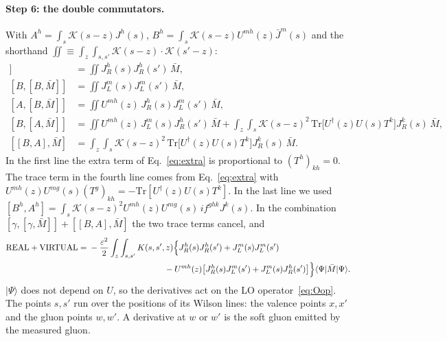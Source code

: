 \documentclass[aps,prd,onecolumn,superscriptaddress,nofootinbib,floatfix,longbibliography,11pt]{revtex4-2}
\numberwithin{equation}{section}
\newcommand{\KK}{\mathcal{K}}
\newcommand{\Ud}{U^{\dagger}}
\newcommand{\Tr}{\mathrm{Tr}}
\begin{document}
\paragraph*{Step 6: the double commutators.} With $A^h=\int_s\KK(s-z)J^h(s)$, $B^h=\int_s\KK(s-z)U^{mh}(z)\bar J^m(s)$ and the shorthand $\iint\equiv\int_z\int_{s,s'}\KK(s-z)\cdot\KK(s'-z)$:
\begin{align}
[A,[A,\bar M]]&=\iint J_R^h(s)J_R^h(s')\,\bar M,\\
[B,[B,\bar M]]&=\iint J_L^m(s)J_L^m(s')\,\bar M,\\
[A,[B,\bar M]]&=\iint U^{mh}(z)\,J_R^h(s)J_L^m(s')\,\bar M,\\
[B,[A,\bar M]]&=\iint U^{mh}(z)\,J_L^m(s)J_R^h(s')\,\bar M+\int_z\int_s\KK(s-z)^2\,\Tr\big[\Ud(z)U(s)T^k\big]J_R^k(s)\,\bar M,\\
[[B,A],\bar M]&=\int_z\int_s\KK(s-z)^2\,\Tr\big[\Ud(z)U(s)T^k\big]J_R^k(s)\,\bar M.
\end{align}
In the first line the extra term of Eq.~\eqref{eq:extra} is proportional to $(T^h)_{kh}=0$. The trace term in the fourth line comes from Eq.~\eqref{eq:extra} with $U^{mh}(z)U^{mg}(s)(T^g)_{kh}=-\Tr[\Ud(z)U(s)T^k]$. In the last line we used $[B^h,A^h]=\int_s\KK(s-z)^2U^{mh}(z)U^{mg}(s)\,if^{ghk}J^k(s)$. In the combination $[\gamma,[\gamma,\bar M]]+[[B,A],\bar M]$ the two trace terms cancel, and
\begin{align}
\text{REAL}+\text{VIRTUAL}={}&-\frac{\varepsilon^2}{2}\int_z\int_{s,s'}K(s,s',z)\Big\{J_R^h(s)J_R^h(s')+J_L^m(s)J_L^m(s')\notag\\
&\hspace{9em}-U^{mh}(z)\big[J_R^h(s)J_L^m(s')+J_L^m(s)J_R^h(s')\big]\Big\}\langle\Psi|\bar M|\Psi\rangle .
\label{eq:HLR}
\end{align}
$|\Psi\rangle$ does not depend on $U$, so the derivatives act on the LO operator~\eqref{eq:Oop}. The points $s,s'$ run over the positions of its Wilson lines: the valence points $x,x'$ and the gluon points $w,w'$. A derivative at $w$ or $w'$ is the soft gluon emitted by the measured gluon.
\end{document}
